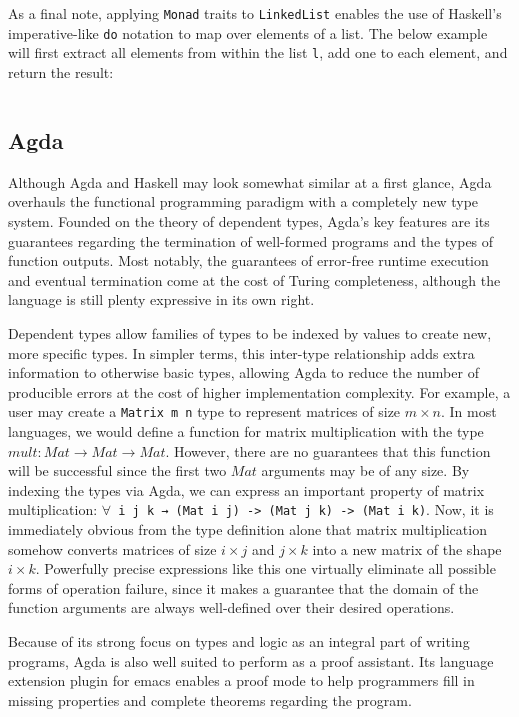 \documentclass{article}
\begin{document}
As a final note, applying \texttt{Monad} traits to \texttt{LinkedList} enables the use of Haskell's imperative-like
\texttt{do} notation to map over elements of a list. The below example will first extract all elements from within
the list \texttt{l}, add one to each element, and return the result:
\inputminted{haskell}{linked_list/main_2.hs}

\subsection{Agda}

Although Agda and Haskell may look somewhat similar at a first glance, Agda overhauls the functional programming
paradigm with a completely new type system. Founded on the theory of dependent types, Agda's key features
are its guarantees regarding the termination of well-formed programs and the types of function outputs.
Most notably, the guarantees of error-free runtime execution and eventual termination
come at the cost of Turing completeness, although the language
is still plenty expressive in its own right.

Dependent types allow families of types to be indexed by values to create new, more specific types.
In simpler terms, this inter-type relationship adds extra information to otherwise basic types,
allowing Agda to reduce the number of producible errors at the cost of higher implementation complexity.
For example, a user may create a \texttt{Matrix m n} type to represent matrices of size $m\times n$.
In most languages, we would define a function for matrix multiplication with the type $mult: Mat \rightarrow Mat \rightarrow Mat$.
However, there are no guarantees that this function will be successful since the first two $Mat$ arguments
may be of any size. By indexing the types via Agda, we can express an important property of matrix multiplication:
\texttt{$\forall$ {i j k} → (Mat i j) -> (Mat j k) -> (Mat i k)}. Now, it is immediately obvious from the type definition alone
that matrix multiplication somehow converts matrices of size $i\times j$ and $j \times k$ into a new matrix of the shape $i \times k$.
Powerfully precise expressions like this one virtually eliminate all possible forms of operation failure,
since it makes a guarantee that the domain of the function arguments are always well-defined over their desired operations.

Because of its strong focus on types and logic as an integral part of writing programs, Agda is also well suited
to perform as a proof assistant. Its language extension plugin for emacs enables a proof mode
to help programmers fill in missing properties and complete theorems regarding the program.
\end{document}
